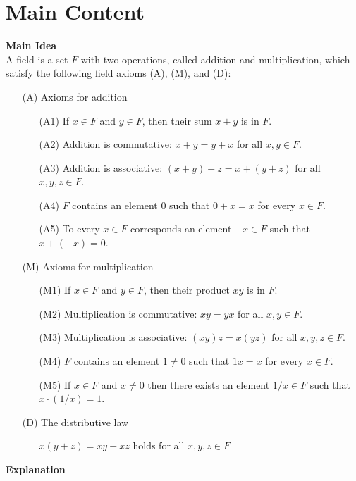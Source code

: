 \section*{Main Content}
\textbf{Main Idea}\\
A field is a set $F$ with two operations, called addition and multiplication, which satisfy the following field axioms (A), (M), and (D):
\begin{itemize}
  \item[(A)] Axioms for addition
    \begin{itemize}
      \item[(A1)] If $x \in F$ and $y \in F$, then their sum $x+y$ is in $F$.
      \item[(A2)] Addition is commutative: $x+y = y+x$ for all $x, y \in F$.
      \item[(A3)] Addition is associative: $(x+y) + z = x + (y+z)$ for all $x,y,z \in F$.
      \item[(A4)] $F$ contains an element 0 such that $0 + x = x$ for every $x \in F$.
      \item[(A5)] To every $x \in F$ corresponds an element $-x \in F$ such that $x + (-x) = 0$.
    \end{itemize}
  \item[(M)] Axioms for multiplication
    \begin{itemize}
      \item[(M1)] If $x \in F$ and $y \in F$, then their product $xy$ is in $F$.
      \item[(M2)] Multiplication is commutative: $xy = yx$ for all $x,y \in F$.
      \item[(M3)] Multiplication is associative: $(xy)z = x(yz)$ for all $x,y,z \in F$.
      \item[(M4)] $F$ contains an element $1 \neq 0$ such that $1x = x$ for every $x \in F$.
      \item[(M5)] If $x \in F$ and $x \neq 0$ then there exists an element $1/x \in F$ such that $x \cdot (1/x) = 1$.
    \end{itemize}
  \item[(D)] The distributive law
    \begin{itemize}
      \item[] $x(y+z) = xy + xz$ holds for all $x,y,z \in F$
    \end{itemize}
\end{itemize}

\textbf{Explanation}\\


